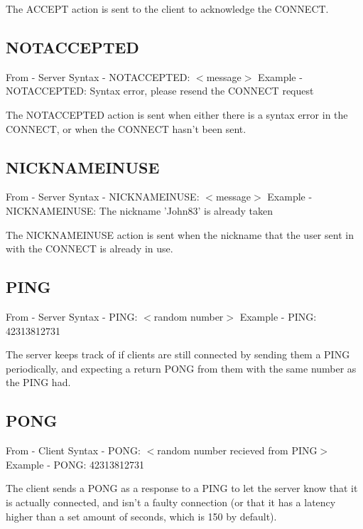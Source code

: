 \documentclass[12pt]{rapport}
\begin{document}
\noindent The ACCEPT action is sent to the client to acknowledge the CONNECT.

\subsection*{NOTACCEPTED}
From    - Server\newline
Syntax  - NOTACCEPTED: $<$message$>$\newline
Example - NOTACCEPTED: Syntax error, please resend the CONNECT request\newline

\noindent The NOTACCEPTED action is sent when either there is a syntax error in the CONNECT, or when the CONNECT hasn't been sent.

\subsection*{NICKNAMEINUSE}
From    - Server\newline
Syntax  - NICKNAMEINUSE: $<$message$>$\newline
Example - NICKNAMEINUSE: The nickname 'John83' is already taken\newline

\noindent The NICKNAMEINUSE action is sent when the nickname that the user sent in with the CONNECT is already in use.

\subsection*{PING}
From    - Server\newline
Syntax  - PING: $<$random number$>$\newline
Example - PING: 42313812731\newline

\noindent The server keeps track of if clients are still connected by sending them a PING periodically, and expecting a return PONG from them with the same number as the PING had.

\subsection*{PONG}
From    - Client\newline
Syntax  - PONG: $<$random number recieved from PING$>$\newline
Example - PONG: 42313812731\newline

\noindent The client sends a PONG as a response to a PING to let the server know that it is actually connected, and isn't a faulty connection (or that it has a latency higher than a set amount of seconds, which is 150 by default).
\end{document}
